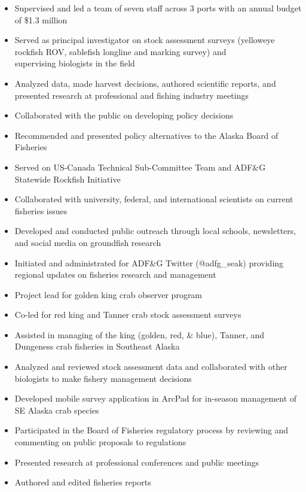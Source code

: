 \documentclass[10pt,a4paper,ragged2e]{altacv}
\begin{document}
\begin{fullwidth}
\begin{itemize}
\item Supervised and led a team of seven staff across 3 ports with an annual budget of \$1.3 million
\item Served as principal investigator on stock assessment surveys (yelloweye \\rockfish ROV, sablefish longline and marking survey) and \\supervising biologists in the field
\item Analyzed data, made harvest decisions, authored scientific reports, and presented research at professional and fishing industry meetings 
\item Collaborated with the public on developing policy decisions
\item Recommended and presented policy alternatives to the Alaska Board of Fisheries
\item Served on US-Canada Technical Sub-Committee Team and ADF\&G Statewide Rockfish Initiative
\item Collaborated with university, federal, and international scientists on current fisheries issues
\item Developed and conducted public outreach through local schools, newsletters, and social media on groundfish research 
\item Initiated and administrated for ADF\&G Twitter (@adfg\_seak) providing regional updates on fisheries research and management




\end{itemize}
\vspace{2.0cm}


\begin{itemize}
\item Project lead for golden king crab observer program 
\item Co-led for red king and Tanner crab stock assessment surveys
\item Assisted in managing of the king (golden, red, \& blue), Tanner, and Dungeness crab fisheries in Southeast Alaska
\item Analyzed and reviewed stock assessment data and collaborated with other biologists to make fishery management decisions
\item Developed mobile survey application in ArcPad for in-season management of SE Alaska crab species
\item Participated in the Board of Fisheries regulatory process by reviewing and commenting on public proposals to regulations
\item Presented research at professional conferences and public meetings
\item Authored and edited fisheries reports
\end{itemize}
\vspace{0.15cm}


\end{fullwidth}
\end{document}
